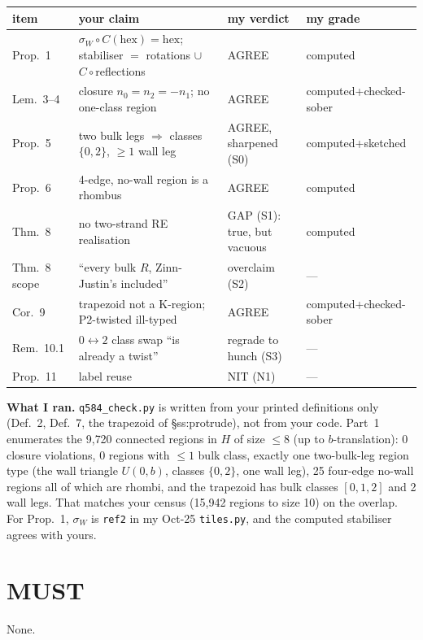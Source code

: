 \documentclass[11pt]{amsart}
\newcommand{\gr}[1]{\textsf{#1}}
\newcommand{\sW}{\sigma_W}
\theoremstyle{definition}
\begin{document}
\begin{center}\small
\begin{tabularx}{\linewidth}{@{}lXll@{}}
\toprule
item & your claim & my verdict & my grade \\
\midrule
Prop.~1 & $\sW\circ C(\mathrm{hex})=\mathrm{hex}$; stabiliser $=$ rotations $\cup$ $C\circ$reflections & AGREE & \gr{computed} \\
Lem.~3--4 & closure $n_0=n_2=-n_1$; no one-class region & AGREE & \gr{computed}+\gr{checked-sober} \\
Prop.~5 & two bulk legs $\Rightarrow$ classes $\{0,2\}$, $\ge1$ wall leg & AGREE, sharpened (S0) & \gr{computed}+\gr{sketched} \\
Prop.~6 & 4-edge, no-wall region is a rhombus & AGREE & \gr{computed} \\
Thm.~8 & no two-strand RE realisation & GAP (S1): true, but vacuous & \gr{computed} \\
Thm.~8 scope & ``every bulk $R$, Zinn-Justin's included'' & overclaim (S2) & --- \\
Cor.~9 & trapezoid not a K-region; P2-twisted ill-typed & AGREE & \gr{computed}+\gr{checked-sober} \\
Rem.~10.1 & $0\leftrightarrow2$ class swap ``is already a twist'' & regrade to \gr{hunch} (S3) & --- \\
Prop.~11 & label reuse & NIT (N1) & --- \\
\bottomrule
\end{tabularx}
\end{center}

\noindent\textbf{What I ran.} \texttt{q584\_check.py} is written from your printed definitions only (Def.~2, Def.~7, the trapezoid of \S ss:protrude), not from your code. Part~1 enumerates the 9{,}720 connected regions in $H$ of size $\le 8$ (up to $b$-translation): 0 closure violations, 0 regions with $\le1$ bulk class, exactly one two-bulk-leg region type (the wall triangle $U(0,b)$, classes $\{0,2\}$, one wall leg), 25 four-edge no-wall regions all of which are rhombi, and the trapezoid has bulk classes $[0,1,2]$ and 2 wall legs. That matches your census (15{,}942 regions to size 10) on the overlap. For Prop.~1, $\sW$ is \texttt{ref2} in my Oct-25 \texttt{tiles.py}, and the computed stabiliser agrees with yours.

\section{MUST}
None.
\end{document}
